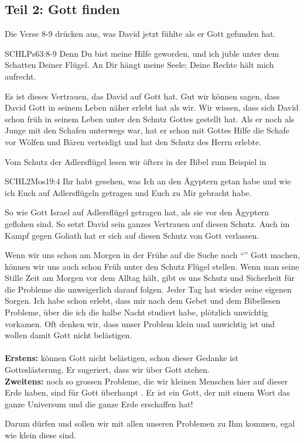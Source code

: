 \documentclass[14pt]{../../inc/mybib}
\begin{document}
    \subsection*{Teil 2: Gott finden}
    \begin{block}
        Die Verse 8-9 drücken aus, was David jetzt fühlte als er Gott gefunden hat.
        \begin{bibelbox}{SCHL}{Ps}{63:8-9}
            Denn Du bist meine Hilfe geworden, und ich juble unter dem Schatten Deiner Flügel. An Dir hängt meine Seele; Deine Rechte hält mich aufrecht.
        \end{bibelbox}
        Es ist dieses Vertrauen, das David auf Gott hat. Gut wir können sagen, dass David Gott in seinem Leben näher erlebt hat als wir. Wir wissen, dass sich David schon früh in seinem Leben unter den Schutz Gottes gestellt hat. Als er noch als Junge mit den Schafen unterwegs war, hat er schon mit Gottes Hilfe die Schafe vor Wölfen und Bären verteidigt und hat den Schutz des Herrn erlebte.

        Vom Schutz der Adlersflügel lesen wir öfters in der Bibel zum Beispiel in
        \begin{bibelbox}{SCHL}{2Mos}{19:4}
            Ihr habt gesehen, was Ich an den Ägyptern getan habe und wie ich Euch auf Adlersflügeln getragen und Euch zu Mir gebracht habe.
        \end{bibelbox}
         So wie Gott Israel auf Adlersflügel getragen hat, als sie vor den Ägyptern geflohen sind. So setzt David sein ganzes Vertrauen auf diesen Schutz. Auch im Kampf gegen Goliath hat er sich auf diesen Schutz von Gott verlassen. 
    \end{block}
    \begin{block}
        Wenn wir uns schon am Morgen in der Frühe auf die Suche nach \enquote{} Gott machen, können wir uns auch schon Früh unter den Schutz  Flügel stellen. Wenn man seine Stille Zeit am Morgen vor dem Alltag hält, gibt es uns Schutz und Sicherheit für die Probleme die unweigerlich darauf folgen. Jeder Tag hat wieder seine eigenen Sorgen. 
        Ich habe schon erlebt, dass mir nach dem Gebet und dem Bibellesen Probleme, über die ich die halbe Nacht studiert habe, plötzlich unwichtig vorkamen. Oft denken wir, dass unser Problem klein und unwichtig ist und wollen damit Gott nicht belästigen.\\        
         \\        
        \textbf{Erstens:}  können Gott nicht belästigen, schon dieser Gedanke ist Gotteslästerung. Er sugeriert, dass wir über Gott stehen. \\        
        \textbf{Zweitens:}  noch so grossen Probleme, die wir kleinen Menschen hier auf dieser Erde haben, sind für Gott überhaupt . Er ist ein Gott, der mit einem Wort das ganze Universum und die ganze Erde erschaffen hat!

        Darum dürfen und sollen wir mit allen unseren Problemen zu Ihm kommen, egal wie klein diese sind.
    \end{block}
\end{document}
